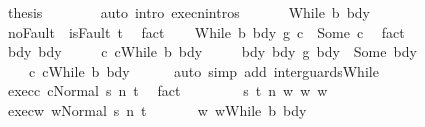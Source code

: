 \begin{isabellebody}
\ {\isacharquery}thesis\isanewline
\ \ \ \ \ \ \isamarkupfalse%
\ {\isacharparenleft}auto\ intro{\isacharcolon}\ execn{\isachardot}intros{\isacharparenright}\isanewline
\ \ \isamarkupfalse%
\isanewline
{}\isamarkupfalse%
\isanewline
\ \ \isamarkupfalse%
\ {\isacharparenleft}While\ b\ bdy{}{\isacharparenright}\isanewline
\ \ \isamarkupfalse%
\ noFault{\isacharcolon}\ {\isachardoublequoteopen}{\isasymnot}\ isFault\ t{\isachardoublequoteclose}\ \isamarkupfalse%
\ fact\isanewline
\ \ \isamarkupfalse%
\ {\isachardoublequoteopen}{\isacharparenleft}While\ b\ bdy{}\ {\isasyminter}\isactrlsub g\ c{}{\isacharparenright}\ {\isacharequal}\ Some\ c{\isachardoublequoteclose}\ \isamarkupfalse%
\ fact\isanewline
\ \ \isamarkupfalse%
\ \isamarkupfalse%
\ bdy{}\ bdy\ \isanewline
\ \ \ \ c{}{\isacharcolon}\ {\isachardoublequoteopen}c{}{\isacharequal}While\ b\ bdy{}{\isachardoublequoteclose}\ \isanewline
\ \ \ \ bdy{\isacharcolon}\ {\isachardoublequoteopen}{\isacharparenleft}bdy{}\ {\isasyminter}\isactrlsub g\ bdy{}{\isacharparenright}\ {\isacharequal}\ Some\ bdy{\isachardoublequoteclose}\ \isanewline
\ \ \ \ c{\isacharcolon}\ {\isachardoublequoteopen}c{\isacharequal}While\ b\ bdy{\isachardoublequoteclose}\isanewline
\ \ \ \ \isamarkupfalse%
\ {\isacharparenleft}auto\ simp\ add{\isacharcolon}\ inter{\isacharunderscore}guards{\isacharunderscore}While{\isacharparenright}\isanewline
\ \ \isamarkupfalse%
\ exec{\isacharunderscore}c{\isacharcolon}\ {\isachardoublequoteopen}{\isasymGamma}{\isasymturnstile}{\isasymlangle}c{\isacharcomma}Normal\ s{\isasymrangle}\ {\isacharequal}n{\isasymRightarrow}\ t{\isachardoublequoteclose}\ \isamarkupfalse%
\ fact\isanewline
\ \ \isacommand{{\isacharbraceleft}}\isamarkupfalse%
\isanewline
\ \ \ \ \isamarkupfalse%
\ s\ t\ n\ w\ w{}\ w{}\isanewline
\ \ \ \ \isamarkupfalse%
\ exec{\isacharunderscore}w{\isacharcolon}\ {\isachardoublequoteopen}{\isasymGamma}{\isasymturnstile}{\isasymlangle}w{\isacharcomma}Normal\ s{\isasymrangle}\ {\isacharequal}n{\isasymRightarrow}\ t{\isachardoublequoteclose}\ \isanewline
\ \ \ \ \isamarkupfalse%
\ w{\isacharcolon}\ {\isachardoublequoteopen}w{\isacharequal}While\ b\ bdy{\isachardoublequoteclose}\isanewline

\end{isabellebody}
